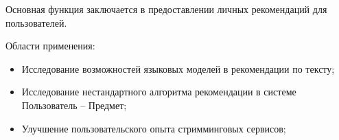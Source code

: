 Основная функция заключается в предоставлении личных рекомендаций для пользователей.

Области применения:

\begin{itemize}
    \item Исследование возможностей языковых моделей в рекомендации по тексту;
    \item Исследование нестандартного алгоритма рекомендации в системе Пользователь -- Предмет;
    \item Улучшение пользовательского опыта стримминговых сервисов;
\end{itemize}
